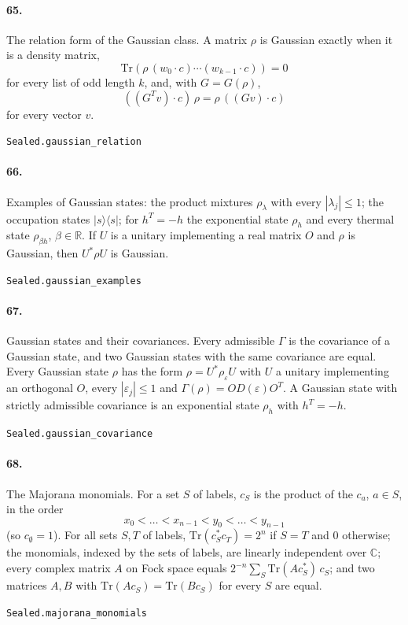 \documentclass[11pt]{article}
\begin{document}
\paragraph{65.} The relation form of the Gaussian class. A matrix $\rho$ is Gaussian exactly when it is a density matrix, \[\mathrm{Tr}(\rho\,(w_0\cdot c)\cdots(w_{k-1}\cdot c)) = 0\] for every list of odd length $k$, and, with $G = G(\rho)$, \[((G^T v)\cdot c)\,\rho = \rho\,((G v)\cdot c)\] for every vector $v$.\par{\footnotesize\texttt{Sealed.gaussian\_relation}}

\paragraph{66.} Examples of Gaussian states: the product mixtures $\rho_\lambda$ with every $|\lambda_j| \le 1$; the occupation states $|s\rangle\langle s|$; for $h^T = -h$ the exponential state $\rho_h$ and every thermal state $\rho_{\beta h}$, $\beta \in \mathbb R$. If $U$ is a unitary implementing a real matrix $O$ and $\rho$ is Gaussian, then $U^* \rho U$ is Gaussian.\par{\footnotesize\texttt{Sealed.gaussian\_examples}}

\paragraph{67.} Gaussian states and their covariances. Every admissible $\Gamma$ is the covariance of a Gaussian state, and two Gaussian states with the same covariance are equal. Every Gaussian state $\rho$ has the form $\rho = U^* \rho_\varepsilon U$ with $U$ a unitary implementing an orthogonal $O$, every $|\varepsilon_j| \le 1$ and $\Gamma(\rho) = O D(\varepsilon) O^T$. A Gaussian state with strictly admissible covariance is an exponential state $\rho_h$ with $h^T = -h$.\par{\footnotesize\texttt{Sealed.gaussian\_covariance}}

\paragraph{68.} The Majorana monomials. For a set $S$ of labels, $c_S$ is the product of the $c_a$, $a \in S$, in the order \[x_0 < \dots < x_{n-1} < y_0 < \dots < y_{n-1}\] (so $c_\emptyset = 1$). For all sets $S, T$ of labels, $\mathrm{Tr}(c_S^* c_T) = 2^n$ if $S = T$ and $0$ otherwise; the monomials, indexed by the sets of labels, are linearly independent over $\mathbb C$; every complex matrix $A$ on Fock space equals $2^{-n}\sum_S \mathrm{Tr}(A c_S^*)\, c_S$; and two matrices $A, B$ with $\mathrm{Tr}(A c_S) = \mathrm{Tr}(B c_S)$ for every $S$ are equal.\par{\footnotesize\texttt{Sealed.majorana\_monomials}}
\end{document}
